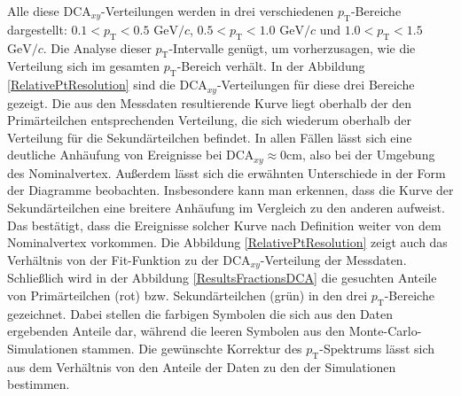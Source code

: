 \documentclass[12pt,a4paper]{report}
\begin{document}
Alle diese $\mathrm{DCA}_{xy}$-Verteilungen werden in drei verschiedenen $p_{\mathrm{T}}$-Bereiche dargestellt: $0.1 < p_{\mathrm{T}} < 0.5$ $\mathrm{GeV}/c$, $0.5 < p_{\mathrm{T}} < 1.0$ $\mathrm{GeV}/c$ und $1.0 < p_{\mathrm{T}} < 1.5$ $\mathrm{GeV}/c$. Die Analyse dieser $p_{\mathrm{T}}$-Intervalle genügt, um vorherzusagen, wie die Verteilung sich im gesamten $p_{\mathrm{T}}$-Bereich verhält. In der Abbildung \ref{RelativePtResolution} sind die $\mathrm{DCA}_{xy}$-Verteilungen für diese drei Bereiche gezeigt. Die aus den Messdaten resultierende Kurve liegt oberhalb der den Primärteilchen entsprechenden Verteilung, die sich wiederum oberhalb der Verteilung für die Sekundärteilchen befindet. In allen Fällen lässt sich eine deutliche Anhäufung von Ereignisse bei $\mathrm{DCA}_{xy} \approx 0 \mathrm{cm}$, also bei der Umgebung des Nominalvertex. Außerdem lässt sich die erwähnten Unterschiede in der Form der Diagramme beobachten. Insbesondere kann man erkennen, dass die Kurve der Sekundärteilchen eine breitere Anhäufung im Vergleich zu den anderen aufweist. Das bestätigt, dass die Ereignisse solcher Kurve nach Definition weiter von dem Nominalvertex vorkommen. Die Abbildung \ref{RelativePtResolution} zeigt auch das Verhältnis von der Fit-Funktion zu der $\mathrm{DCA}_{xy}$-Verteilung der Messdaten. Schließlich wird in der Abbildung \ref{ResultsFractionsDCA} die gesuchten Anteile von Primärteilchen (rot) bzw. Sekundärteilchen (grün) in den drei $p_{\mathrm{T}}$-Bereiche gezeichnet. Dabei stellen die farbigen Symbolen die sich aus den Daten ergebenden Anteile dar, während die leeren Symbolen aus den Monte-Carlo-Simulationen stammen. Die gewünschte Korrektur des $p_{\mathrm{T}}$-Spektrums lässt sich aus dem Verhältnis von den Anteile der Daten zu den der Simulationen bestimmen.

\end{document}
